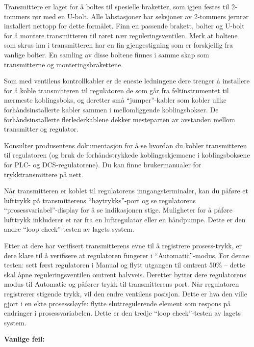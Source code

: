 Transmittere er laget for å boltes til spesielle braketter, som igjen festes til 2-tommers rør med en U-bolt.  Alle labstasjoner har seksjoner av 2-tommers jernrør installert nettopp for dette formålet.  Finn en passende brakett, bolter og U-bolt for å montere transmitteren til røret nær reguleringsventilen.  Merk at boltene som skrus inn i transmitteren har en fin gjengestigning som er forskjellig fra vanlige bolter.  En samling av disse boltene finnes i samme skap som transmitterne og monteringsbrakettene.

Som med ventilens kontrollkabler er de eneste ledningene dere trenger å installere for å koble transmitteren til regulatoren de som går fra feltinstrumentet til nærmeste koblingsboks, og deretter små ``jumper''-kabler som kobler ulike forhåndsinstallerte kabler sammen i mellomliggende koblingsbokser.  De forhåndsinstallerte flerlederkablene dekker mesteparten av avstanden mellom transmitter og regulator.

Konsulter produsentens dokumentasjon for å se hvordan du kobler transmitteren til regulatoren (og bruk de forhåndstrykkede koblingsskjemaene i koblingsboksene for PLC- og DCS-regulatorene).  Du kan finne brukermanualer for trykktransmittere på nett.

\vskip 10pt

Når transmitteren er koblet til regulatorens inngangsterminaler, kan du påføre et lufttrykk på transmitterens ``høytrykks''-port og se regulatorens ``prosessvariabel''-display for å se indikasjonen stige.  Muligheter for å påføre lufttrykk inkluderer et rør fra en luftregulator eller en håndpumpe.  Dette er den andre ``loop check''-testen av lagets system.

\vskip 10pt

Etter at dere har verifisert transmitterens evne til å registrere prosess-trykk, er dere klare til å verifisere at regulatoren fungerer i ``Automatic''-modus.  For denne testen: sett først regulatoren i Manual og flytt utgangen til omtrent 50\% -- dette skal åpne reguleringsventilen omtrent halvveis.  Deretter bytter dere regulatorens modus til Automatic og påfører trykk til transmitterens port.  Når regulatoren registrerer stigende trykk, vil den endre ventilens posisjon.  Dette er hva den ville gjort i en ekte prosesssløyfe: flytte sluttregulerende element som respons på endringer i prosessvariabelen.  Dette er den tredje ``loop check''-testen av lagets system.

\vskip 10pt

{\bf Vanlige feil:}

